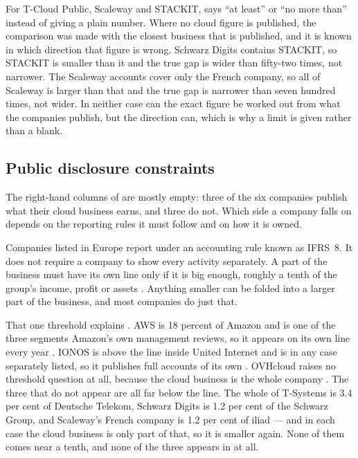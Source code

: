 For T-Cloud Public, Scaleway and STACKIT,  says \enquote{at
least} or \enquote{no more than} instead of giving a plain number. Where no cloud
figure is published, the comparison was made with the closest business that is
published, and it is known in which direction that figure is wrong.
Schwarz Digits contains STACKIT, so STACKIT is smaller than it and the true gap
is wider than fifty-two times, not narrower. The Scaleway accounts cover only the
French company, so all of Scaleway is larger than that and the true gap is
narrower than seven hundred times, not wider. In neither case can the exact figure be worked out from what the companies
publish, but the direction can, which is why a limit is given rather than a blank.

\subsection{Public disclosure constraints}

The right-hand columns of  are mostly empty: three of the
six companies publish what their cloud business earns, and three do not. Which side
a company falls on depends on the reporting rules it must follow and on how it is
owned.

Companies listed in Europe report under an accounting rule known as \acs{IFRS}~8.
It does not require a company to show every activity separately. A part of the
business must have its own line only if it is big enough, roughly a tenth of the
group's income, profit or assets \cite{IFRS8}. Anything smaller can be folded into
a larger part of the business, and most companies do just that.

That one threshold explains . \acs{AWS} is 18 percent
of Amazon and is one of the three segments Amazon's own management reviews, so it
appears on its own line every year \cite{Amazon_10K_2025}. IONOS is above the line
inside United Internet and is in any case separately listed, so it publishes full
accounts of its own \cite{IONOS_AR_2025}. OVHcloud raises no threshold question at
all, because the cloud business is the whole company \cite{OVHcloud_URD_2025}. The
three that do not appear are all far below the line. The whole of T-Systems is
3.4 per cent of Deutsche Telekom, Schwarz Digits is 1.2 per cent of the Schwarz
Group, and Scaleway's French company is 1.2 per cent of iliad --- and in each case
the cloud business is only part of that, so it is smaller again. None of them comes
near a tenth, and none of the three appears in  at all.

